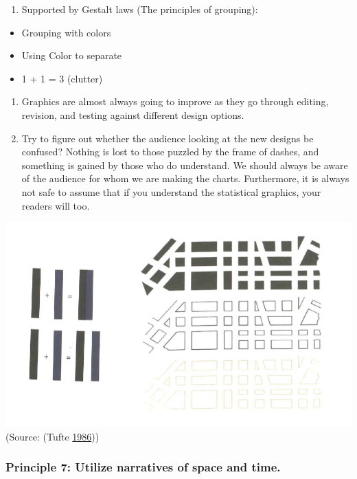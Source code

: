 \documentclass[]{book}
\providecommand{\tightlist}{%
  \setlength{\itemsep}{0pt}\setlength{\parskip}{0pt}}
\begin{document}
\begin{enumerate}
\def\labelenumi{\arabic{enumi}.}
\tightlist
\item
  Supported by Gestalt laws (The principles of grouping):
\end{enumerate}

\begin{itemize}
\tightlist
\item
  Grouping with colors
\item
  Using Color to separate
\item
  1 + 1 = 3 (clutter)
\end{itemize}

\begin{enumerate}
\def\labelenumi{\arabic{enumi}.}
\setcounter{enumi}{1}
\item
  Graphics are almost always going to improve as they go through editing, revision, and testing against different design options.
\item
  Try to figure out whether the audience looking at the new designs be confused? Nothing is lost to those puzzled by the frame of dashes, and something is gained by those who do understand. We should always be aware of the audience for whom we are making the charts. Furthermore, it is always not safe to assume that if you understand the statistical graphics, your readers will too.
\end{enumerate}

\includegraphics{images/Tufte_figure10.png}
(Source: (Tufte \protect\hyperlink{ref-The-Visual-Display-of-Quantitative-Information}{1986}))

\hypertarget{principle-7-utilize-narratives-of-space-and-time.}{%
\subsubsection{Principle 7: Utilize narratives of space and time.}\label{principle-7-utilize-narratives-of-space-and-time.}}
\end{document}
